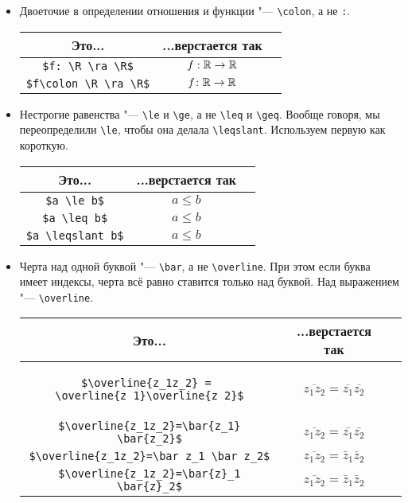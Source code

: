 \begin{enumerate}
\begin{itemize}
	\item 
		Двоеточие в определении отношения и функции "--- \verb'\colon', а не \verb':'.
		\begin{center}\begin{tabular}{|c|c|c|}
			\hline Это... & ...верстается так & \\
			\hline \verb'$f: \R \ra \R$' & $f:\mathbb{R}\rightarrow\mathbb{R}$ \bad \\
			\hline \verb'$f\colon \R \ra \R$' & $f\colon\mathbb{R}\rightarrow\mathbb{R}$ \ok \\
			\hline
		\end{tabular}\end{center}

	\item
		Нестрогие равенства "--- \verb'\le' и \verb'\ge', а не \verb'\leq' и \verb'\geq'.
		Вообще говоря, мы переопределили \verb'\le', чтобы она делала \verb'\leqslant'.
		Используем первую как короткую.
		\begin{center}\begin{tabular}{|c|c|c|}
			\hline Это... & ...верстается так & \\
			\hline \verb'$a \le b$' & $a \le b$ \ok \\
			\hline \verb'$a \leq b$' & $a \leq b$ \bad \\
			\hline \verb'$a \leqslant b$' & $a \leqslant b$ \bad \\
			\hline
		\end{tabular}\end{center}
	
	\item 
		Черта над одной буквой "--- \verb'\bar', а не \verb'\overline'.
		При этом если буква имеет индексы, черта всё равно ставится только над буквой.
		Над выражением "--- \verb'\overline'.
		\begin{center}\begin{tabular}{|c|c|c|}
			\hline Это... & ...верстается так & \\
			\hline
			\begin{minipage}{10cm}
\begin{verbatim}
$\overline{z_1z_2} = 
\overline{z_1}\overline{z_2}$
\end{verbatim}
			\end{minipage}
			& $\overline{z_1z_2} = \overline{z_1}\overline{z_2}$ \bad \\
			\hline \verb'$\overline{z_1z_2}=\bar{z_1} \bar{z_2}$' & $\overline{z_1z_2} = \bar{z_1} \bar{z_2}$ \bad \\
			\hline \verb'$\overline{z_1z_2}=\bar z_1 \bar z_2$' & $\overline{z_1z_2} = \bar z_1 \bar z_2$ \ok \\
			\hline \verb'$\overline{z_1z_2}=\bar{z}_1 \bar{z}_2$' & $\overline{z_1z_2} = \bar z_1 \bar z_2$ \ok \\
			\hline
		\end{tabular}\end{center}


\end{itemize}
\end{enumerate}
